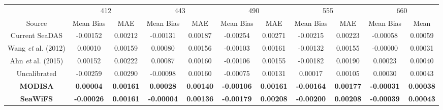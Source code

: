 \documentclass[preview]{standalone}
\begin{document}
\centering
\begin{tabular}{@{\extracolsep{4pt}}ccccccccccc@{}} 
 \hline
 & \multicolumn{2}{c}{412}& \multicolumn{2}{c}{443} & \multicolumn{2}{c}{490} & \multicolumn{2}{c}{555} & \multicolumn{2}{c}{660}\\ \cline{2-3} \cline{4-5} \cline{6-7} \cline{8-9} \cline{10-11}
 Source 					& Mean Bias			& MAE 			& Mean Bias			& MAE 			& Mean Bias 		& MAE 			& Mean Bias 		& MAE 			& Mean Bias 		& Mean 			\\ \cline{1-1}\cline{2-3} \cline{4-5} \cline{6-7} \cline{8-9} \cline{10-11} 
Current SeaDAS 				& -0.00152 			& 0.00212 		& -0.00131 			& 0.00187 		& -0.00254 			& 0.00271 		& -0.00215 			& 0.00223 		& -0.00058 			& 0.00059 		\\
Wang {\it et} al. (2012) 	& 0.00010 			& 0.00159 		& 0.00080 			& 0.00156 		& -0.00103 			& 0.00161 		& -0.00132 			& 0.00155 		& -0.00000 			& 0.00031 		\\
Ahn {\it et} al. (2015) 	& 0.00152 			& 0.00222 		& 0.00087 			& 0.00160 		& -0.00106 			& 0.00155 		& -0.00182 			& 0.00190 		& 0.00023  			& 0.00040 		\\
Uncalibrated 				& -0.00259 			& 0.00290 		& -0.00098 			& 0.00160 		& -0.00075 			& 0.00131 		& 0.00017 			& 0.00105 		& 0.00030  			& 0.00043 		\\
{\bf MODISA} 				& {\bf 0.00004} 	& {\bf 0.00161} & {\bf 0.00028} 	& {\bf 0.00140} & {\bf -0.00106} 	& {\bf 0.00161} & {\bf -0.00164} 	& {\bf 0.00177} & {\bf -0.00031} 	& {\bf 0.00038} \\
{\bf SeaWiFS} 				& {\bf -0.00026} 	& {\bf 0.00161} & {\bf -0.00004} 	& {\bf 0.00136} & {\bf -0.00179} 	& {\bf 0.00208} & {\bf -0.00200} 	& {\bf 0.00208} & {\bf -0.00039} 	& {\bf 0.00043} \\ \hline




\end{tabular}
\end{document}

